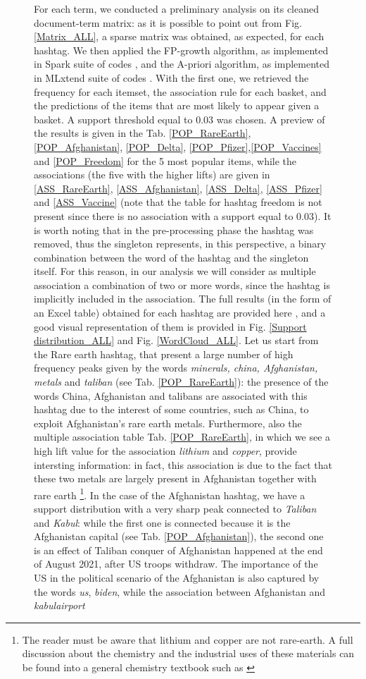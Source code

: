 \documentclass[12pt,%
               a4paper,%
               oneside,openany,%
               titlepage,%
               headinclude,footinclude,%
               BCOR5mm,%
               cleardoublepage=empty,%
               tablecaptionabove,%
               floatperchapter,
               ]{scrreprt}                 %
\begin{document}
\begin{figure}[ht]
\begin{minipage}[b]{0.5\linewidth}
For each term, we conducted a preliminary analysis on its cleaned document-term matrix: as it is possible to point out from Fig. \ref{Matrix_ALL}, a sparse matrix was obtained, as expected,  for each hashtag.  We then applied the FP-growth algorithm,  as implemented in Spark suite of codes \cite{zaharia2016apache} ,  and the A-priori algorithm,  as implemented in MLxtend suite of codes \cite{raschka2018mlxtend}. With the first one, we retrieved the frequency for each itemset,  the association rule for each basket, and the predictions of the items that are most likely to appear given a basket.  A support threshold equal to 0.03 was chosen. A preview of the results is given in the Tab. \ref{POP_RareEarth}, \ref{POP_Afghanistan}, \ref{POP_Delta}, \ref{POP_Pfizer},\ref{POP_Vaccines} and \ref{POP_Freedom}  for the 5 most popular items, while the associations (the five with the higher lifts) are given in \ref{ASS_RareEarth}, \ref{ASS_Afghanistan}, \ref{ASS_Delta}, \ref{ASS_Pfizer} and \ref{ASS_Vaccine} (note that the table for hashtag freedom is not present since there is no association with a support equal to 0.03). It is worth noting that in the pre-processing phase the hashtag was removed, thus the singleton represents, in this perspective, a binary combination between the word of the hashtag and the singleton itself. For this reason, in our analysis we will consider as multiple association a combination of two or more words, since the hashtag is implicitly included in the association. The full results (in the form of an Excel table) obtained for each hashtag are provided here \cite{Folder},  and a good visual representation of them is provided in Fig. \ref{Support distribution_ALL} and Fig. \ref{WordCloud_ALL}.  Let us start from the Rare earth hashtag, that present a large number of high frequency peaks given by the words \textit{minerals, china, Afghanistan, metals} and \textit{taliban} (see Tab. \ref{POP_RareEarth}): the presence of the words China, Afghanistan and talibans are associated with this hashtag due to the interest of some countries, such as China, to exploit Afghanistan’s rare earth metals. Furthermore, also the multiple association table Tab. \ref{POP_RareEarth}, in which we see a high lift value for the association \textit{lithium} and \textit{copper}, provide intersting information: in fact, this association is due to the fact that these two metals are largely present in Afghanistan together with rare earth \footnote{The reader must be aware that lithium and copper are not rare-earth. A full discussion about the chemistry and the industrial uses of these materials can be found into a general chemistry textbook such as \cite{petrucci2010general}}. In the case of the Afghanistan hashtag, we have a support distribution with a very sharp peak connected to \textit{Taliban} and \textit{Kabul}: while the first one is connected because it is the Afghanistan capital (see Tab. \ref{POP_Afghanistan}), the second one is an effect of Taliban conquer of Afghanistan happened at the end of August 2021, after US troops withdraw. The importance of the US in the political scenario of the Afghanistan is also captured by the words \textit{us}, \textit{biden}, while the association between Afghanistan and \textit{kabulairport} 
\end{minipage}
\end{figure}
\end{document}
